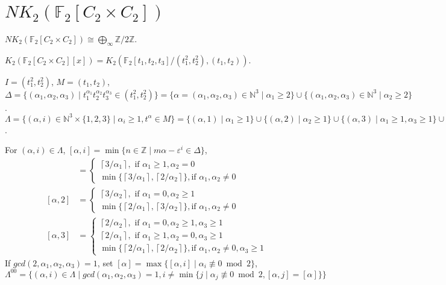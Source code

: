 \section{$NK_2(\mathbb{F}_2[C_2\times C_2])$} %
\label{sec:NK_2(F_2[C_2C_2])}
\begin{theorem}
	$NK_2(\mathbb{F}_2[C_2\times C_2])\cong \bigoplus_{\infty}\mathbb{Z}/2\mathbb{Z}$.
\end{theorem}
$K_2(\mathbb{F}_2[C_2\times C_2][x])=K_2(\mathbb{F}_2[t_1,t_2,t_3]/(t_1^2,t_2^2),(t_1,t_2))$.

$I=(t_1^2,t_2^2)$, $M=(t_1,t_2)$, $\Delta=\{(\alpha_1,\alpha_2,\alpha_3) \mid t_1^{\alpha_1}t_2^{\alpha_2}t_3^{\alpha_3} \in (t_1^2,t_2^2)\}=\{\alpha=(\alpha_1,\alpha_2,\alpha_3) \in \mathbb{N}^3\mid \alpha_1 \geq 2\}\cup \{(\alpha_1,\alpha_2,\alpha_3) \in \mathbb{N}^3\mid \alpha_2 \geq 2\}$. $\Lambda=\{(\alpha,i)\in\mathbb{N}^3\times \{1,2,3\}\mid \alpha_i\geq 1, t^\alpha \in M \}=\{(\alpha,1) \mid \alpha_1 \geq 1 \}\cup\{(\alpha,2) \mid \alpha_2 \geq 1 \}\cup\{(\alpha,3) \mid \alpha_1 \geq 1,\alpha_3\geq 1 \}\cup\{(\alpha,3) \mid \alpha_2 \geq 1,\alpha_3\geq 1 \}$.

For $(\alpha,i)\in \Lambda$, $[\alpha,i]=\min\{n\in \mathbb{Z} \mid m\alpha - \varepsilon^i \in \Delta\}$, 
\begin{align*}
[\alpha,1]&=\begin{cases}
	\left \lceil 3/\alpha_1 \right \rceil, \text{ if $\alpha_1\geq 1,\alpha_2=0$} \\
	\min \{\left \lceil 3/\alpha_1 \right \rceil,\left \lceil 2/\alpha_2 \right \rceil\}, \text{if $\alpha_1,\alpha_2\neq 0$} 
\end{cases} \\
[\alpha,2]&= \begin{cases}
	\left \lceil 3/\alpha_2 \right \rceil, \text{ if $\alpha_1=0,\alpha_2\geq 1$} \\
	\min \{\left \lceil 2/\alpha_1 \right \rceil,\left \lceil 3/\alpha_2 \right \rceil\}, \text{if $\alpha_1,\alpha_2\neq 0$} 
\end{cases}\\
[\alpha,3]&= \begin{cases}
	\left \lceil 2/\alpha_2 \right \rceil, \text{ if $\alpha_1=0,\alpha_2\geq 1, \alpha_3\geq 1$} \\
	\left \lceil 2/\alpha_1 \right \rceil, \text{ if $\alpha_1\geq 1,\alpha_2=0, \alpha_3\geq 1$} \\
	\min \{\left \lceil 2/\alpha_1 \right \rceil,\left \lceil 2/\alpha_2 \right \rceil\}, \text{if $\alpha_1,\alpha_2\neq 0,\alpha_3\geq 1$} 
\end{cases}
\end{align*}
If $gcd(2,\alpha_1,\alpha_2,\alpha_3)=1$, set $[\alpha]=\max\{[\alpha,i]\mid \alpha_i \not\equiv 0 \bmod 2\}$, $\Lambda^{00}= \big\{(\alpha,i)\in \Lambda\mid  gcd(\alpha_1,\alpha_2,\alpha_3)=1, i\neq \min\{j\mid \alpha_j\not\equiv 0 \bmod 2, [\alpha,j]=[\alpha]\} \big\}$


